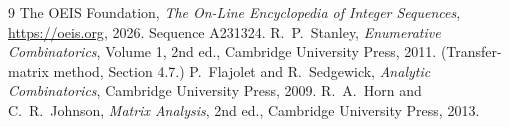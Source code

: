 \documentclass[11pt,a4paper]{article}
\theoremstyle{plain}
\theoremstyle{definition}
\begin{document}
\begin{thebibliography}{9}
 The OEIS Foundation, \emph{The On-Line Encyclopedia of Integer
Sequences}, \url{https://oeis.org}, 2026. Sequence A231324.
 R.~P.~Stanley, \emph{Enumerative Combinatorics}, Volume 1, 2nd ed.,
Cambridge University Press, 2011. (Transfer-matrix method, Section 4.7.)
 P.~Flajolet and R.~Sedgewick, \emph{Analytic Combinatorics}, Cambridge
University Press, 2009.
 R.~A.~Horn and C.~R.~Johnson, \emph{Matrix Analysis}, 2nd ed., Cambridge
University Press, 2013.
\end{thebibliography}
\end{document}

